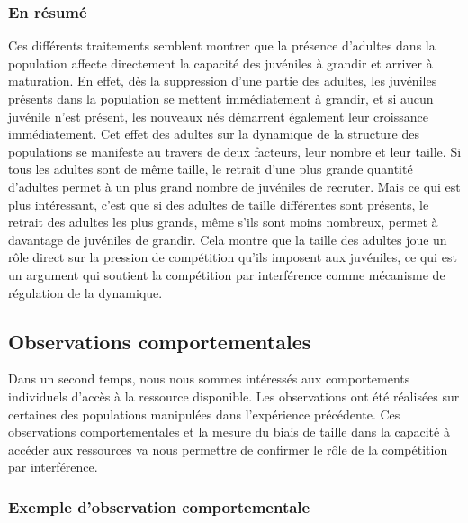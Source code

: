 \subsubsection{En résumé}

Ces différents traitements semblent montrer que la présence d'adultes dans la
population affecte directement la capacité des juvéniles à grandir et arriver
à maturation. En effet, dès la suppression d'une partie des adultes, les
juvéniles présents dans la population se mettent immédiatement à grandir, et si
aucun juvénile n'est présent, les nouveaux nés démarrent également leur
croissance immédiatement. Cet effet des adultes sur la dynamique de la structure
des populations se manifeste au travers de deux facteurs, leur nombre et leur
taille. Si tous les adultes sont de même taille, le retrait d'une plus grande
quantité d'adultes permet à un plus grand nombre de juvéniles de recruter. Mais
ce qui est plus intéressant, c'est que si des adultes de taille différentes sont
présents, le retrait des adultes les plus grands, même s'ils sont moins
nombreux, permet à davantage de juvéniles de grandir. Cela montre que la taille des
adultes joue un rôle direct sur la pression de compétition qu'ils imposent aux
juvéniles, ce qui est un argument qui soutient la compétition par
interférence comme mécanisme de régulation de la dynamique. 

\subsection{Observations comportementales}

Dans un second temps, nous nous sommes intéressés aux comportements
individuels d'accès à la ressource disponible. Les observations ont été
réalisées sur certaines des populations manipulées dans l'expérience précédente.
Ces observations comportementales et la mesure du biais de taille dans la capacité à accéder aux
ressources va nous permettre de confirmer le rôle de la compétition par
interférence.

\subsubsection{Exemple d'observation comportementale}

